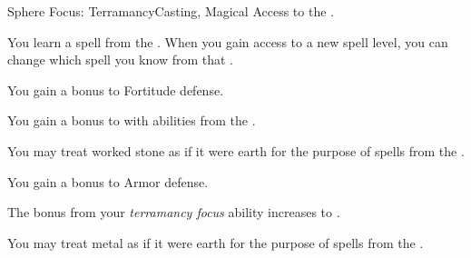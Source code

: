     \begin{feat}{Sphere Focus: Terramancy}{Casting, Magical}
        \featpre Access to the  .

         You learn a spell from the  .
        When you gain access to a new spell level, you can change which spell you know from that .

         You gain a  bonus to Fortitude defense.

         You gain a  bonus to  with abilities from the  .

         You may treat worked stone as if it were earth for the purpose of spells from the  .

         You gain a  bonus to Armor defense.

         The bonus from your \textit{terramancy focus} ability increases to .

         You may treat metal as if it were earth for the purpose of spells from the  .
    \end{feat}

